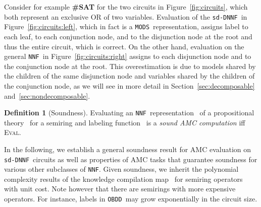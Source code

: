 \documentclass{article}
\theoremstyle{plain}
\theoremstyle{definition}
\newtheorem{definition}{Definition}
\newcommand{\NNF}{{\tt NNF}}
\newcommand{\sdDNNF}{{\tt sd-DNNF}}
\newcommand{\MODS}{{\tt MODS}}
\newcommand{\OBDDo}{{\tt OBDD}}
\begin{document}
Consider for example \textbf{\#SAT} for the two circuits in
Figure~\ref{fig:circuits}, which both represent an exclusive OR of two
variables. Evaluation of the \sdDNNF\ in Figure~\ref{fig:circuits:left}, which in fact
is a \MODS\ representation, assigns label  to each leaf, 
 to each conjunction
node, and 
 to the disjunction
node at the root and thus the entire circuit, which is correct. On the
other hand, evaluation on the general \NNF\   in
Figure~\ref{fig:circuits:right} assigns  to each disjunction
node and  to the conjunction node at the root. This
overestimation is due to models shared by the children of the same
disjunction node and variables shared by the children of the
conjunction node, as we will see in more detail in Section~\ref{sec:decomposable} and~\ref{sec:nondecomposable}.   


\begin{definition}[Soundness]
Evaluating an \NNF\ representation~ of a propositional theory~
for a  semiring 
and labeling function~   is a
\emph{sound AMC computation} iff \textsc{Eval}.
\end{definition}
In the following, we establish a general soundness result for AMC
evaluation on \sdDNNF\ circuits as
well as properties of AMC tasks that guarantee soundness for various
other subclasses of \NNF. Given soundness, we inherit the polynomial
complexity results of the knowledge compilation
map~\citep{darwiche2002knowledge} for 
semiring operators with unit cost.
Note however that there are semirings with more
expensive operators. For instance, labels in  \OBDDo\ may grow exponentially
in the circuit size.
\end{document}
